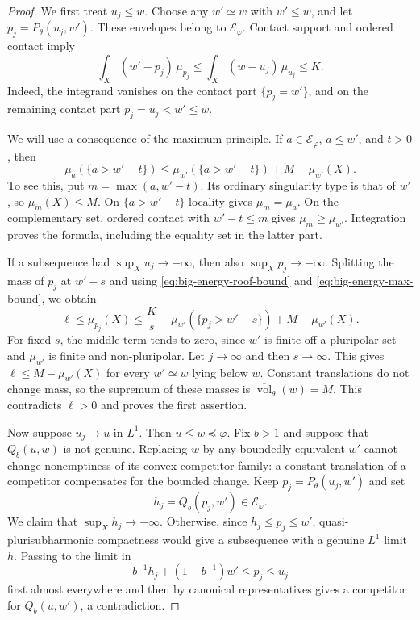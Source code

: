 \begin{proof}
We first treat $u_j\leq w$. Choose any $w'\simeq w$ with $w'\leq w$, and let $p_j=P_\theta(u_j,w')$. These envelopes belong to $\mathcal E_\varphi$. Contact support and ordered contact imply
\begin{equation}\label{eq:big-energy-roof-bound}
 \int_X(w'-p_j)\,\mu_{p_j}
 \leq\int_X(w-u_j)\,\mu_{u_j}\leq K.
\end{equation}
Indeed, the integrand vanishes on the contact part $\{p_j=w'\}$, and on the remaining contact part $p_j=u_j<w'\leq w$.

We will use a consequence of the maximum principle. If $a\in\mathcal E_\varphi$, $a\leq w'$, and $t>0$, then
\begin{equation}\label{eq:big-energy-max-bound}
 \mu_a(\{a>w'-t\})
 \leq \mu_{w'}(\{a>w'-t\})+M-\mu_{w'}(X).
\end{equation}
To see this, put $m=\max(a,w'-t)$. Its ordinary singularity type is that of $w'$, so $\mu_m(X)\leq M$. On $\{a>w'-t\}$ locality gives $\mu_m=\mu_a$. On the complementary set, ordered contact with $w'-t\leq m$ gives $\mu_m\geq\mu_{w'}$. Integration proves the formula, including the equality set in the latter part.

If a subsequence had $\sup_Xu_j\to-\infty$, then also $\sup_Xp_j\to-\infty$. Splitting the mass of $p_j$ at $w'-s$ and using \eqref{eq:big-energy-roof-bound} and \eqref{eq:big-energy-max-bound}, we obtain
\[
 \ell\leq\mu_{p_j}(X)
 \leq\frac Ks+\mu_{w'}(\{p_j>w'-s\})+M-\mu_{w'}(X).
\]
For fixed $s$, the middle term tends to zero, since $w'$ is finite off a pluripolar set and $\mu_{w'}$ is finite and non-pluripolar. Let $j\to\infty$ and then $s\to\infty$. This gives $\ell\leq M-\mu_{w'}(X)$ for every $w'\simeq w$ lying below $w$. Constant translations do not change mass, so the supremum of these masses is $\overline{\operatorname{vol}}_\theta(w)=M$. This contradicts $\ell>0$ and proves the first assertion.

Now suppose $u_j\to u$ in $L^1$. Then $u\leq w\preceq\varphi$. Fix $b>1$ and suppose that $Q_b(u,w)$ is not genuine. Replacing $w$ by any boundedly equivalent $w'$ cannot change nonemptiness of its convex competitor family: a constant translation of a competitor compensates for the bounded change. Keep $p_j=P_\theta(u_j,w')$ and set
\[
 h_j=Q_b(p_j,w')\in\mathcal E_\varphi.
\]
We claim that $\sup_Xh_j\to-\infty$. Otherwise, since $h_j\leq p_j\leq w'$, quasi-plurisubharmonic compactness would give a subsequence with a genuine $L^1$ limit $h$. Passing to the limit in
\[
 b^{-1}h_j+(1-b^{-1})w'\leq p_j\leq u_j
\]
first almost everywhere and then by canonical representatives gives a competitor for $Q_b(u,w')$, a contradiction.


\end{proof}
